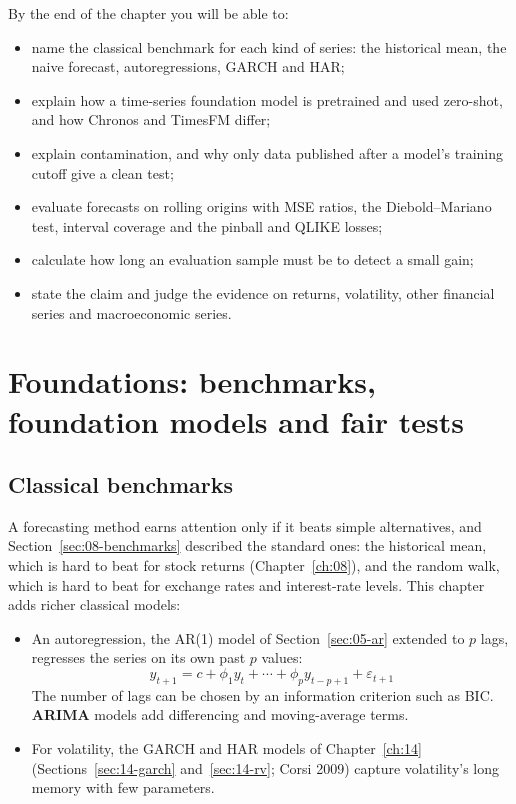 By the end of the chapter you will be able to:

\begin{itemize}
  \item name the classical benchmark for each kind of series: the historical mean, the naive forecast, autoregressions, GARCH and HAR;
  \item explain how a time-series foundation model is pretrained and used zero-shot, and how Chronos and TimesFM differ;
  \item explain contamination, and why only data published after a model's training cutoff give a clean test;
  \item evaluate forecasts on rolling origins with MSE ratios, the Diebold--Mariano test, interval coverage and the pinball and QLIKE losses;
  \item calculate how long an evaluation sample must be to detect a small gain;
  \item state the claim and judge the evidence on returns, volatility, other financial series and macroeconomic series.
\end{itemize}

\section{Foundations: benchmarks, foundation models and fair tests}
\label{sec:21-foundations}

\subsection{Classical benchmarks}

A forecasting method earns attention only if it beats simple alternatives, and Section~\ref{sec:08-benchmarks} described the standard ones: the historical mean, which is hard to beat for stock returns (Chapter~\ref{ch:08}), and the random walk, which is hard to beat for exchange rates and interest-rate levels. This chapter adds richer classical models:
\begin{itemize}
  \item An autoregression, the AR(1) model of Section~\ref{sec:05-ar} extended to $p$ lags, regresses the series on its own past $p$ values:
  \begin{equation}
    y_{t+1} = c + \phi_1 y_t + \cdots + \phi_p y_{t-p+1} + \varepsilon_{t+1}
    \label{eq:21-ar}
  \end{equation}
  The number of lags can be chosen by an information criterion such as BIC. \textbf{ARIMA} models add differencing and moving-average terms.
  \item For volatility, the GARCH and HAR models of Chapter~\ref{ch:14} (Sections~\ref{sec:14-garch} and~\ref{sec:14-rv}; Corsi 2009) capture volatility's long memory with few parameters.
\end{itemize}

